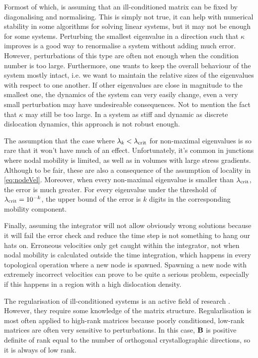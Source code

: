 Formost of which, is assuming that an ill-conditioned matrix can be fixed by diagonalising and normalising. This is simply not true, it can help with numerical stability in some algorithms for solving linear systems, but it may not be enough for some systems. Perturbing the smallest eigenvalue in a direction such that $\kappa$ improves is a good way to renormalise a system without adding much error. However, perturbations of this type are often not enough when the condition number is too large. Furthermore, one wants to keep the overall behaviour of the system mostly intact, i.e. we want to maintain the relative sizes of the eigenvalues with respect to one another. If other eigenvalues are close in magnitude to the smallest one, the dynamics of the system can very easily change, even a very small perturbation may have undesireable consequences. Not to mention the fact that $\kappa$ may still be too large. In a system as stiff and dynamic as discrete dislocation dynamics, this approach is not robust enough.

The assumption that the case where $\lambda_k < \lambda_{\textrm{crit}}$ for non-maximal eigenvalues is so rare that it won't have much of an effect. Unfortunately, it's common in junctions where nodal mobility is limited, as well as in volumes with large stress gradients. Although to be fair, these are also a consequence of the assumption of locality in \cref{eq:nodeVel}. Moreover, when every non-maximal eigenvalue is smaller than $\lambda_{\textrm{crit}}$, the error is much greater. For every eigenvalue under the threshold of $\lambda_{\textrm{crit}} = 10^{-k}$, the upper bound of the error is $k$ digits in the corresponding mobility component.

Finally, assuming the integrator will not allow obviously wrong solutions because it will fail the error check and reduce the time step is not something to hang our hats on. Erroneous velocities only get caught within the integrator, not when nodal mobility is calculated outside the time integration, which happens in every topological operation where a new node is spawned. Spawning a new node with extremely incorrect velocities can prove to be quite a serious problem, especially if this happens in a region with a high dislocation density.

The regularisation of ill-conditioned systems is an active field of research \cite{regularisation1,regularisation2,regularisation3}. However, they require some knowledge of the matrix structure. Regularlisation is most often applied to high-rank matrices because poorly conditioned, low-rank matrices are often very sensitive to perturbations. In this case, $\mathbf{B}$ is positive definite of rank equal to the number of orthogonal crystallographic directions, so it is always of low rank.

